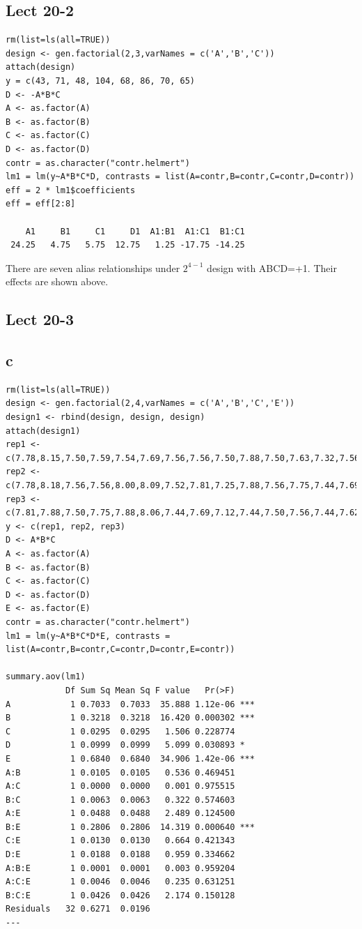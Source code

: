 \documentclass[11pt,letterpaper]{article}
\begin{document}
\newpage
\subsection*{Lect 20-2}
\begin{verbatim}
rm(list=ls(all=TRUE))
design <- gen.factorial(2,3,varNames = c('A','B','C'))
attach(design)
y = c(43, 71, 48, 104, 68, 86, 70, 65)
D <- -A*B*C
A <- as.factor(A)
B <- as.factor(B)
C <- as.factor(C)
D <- as.factor(D)
contr = as.character("contr.helmert")
lm1 = lm(y~A*B*C*D, contrasts = list(A=contr,B=contr,C=contr,D=contr))
eff = 2 * lm1$coefficients
eff = eff[2:8]

    A1     B1     C1     D1  A1:B1  A1:C1  B1:C1 
 24.25   4.75   5.75  12.75   1.25 -17.75 -14.25 
\end{verbatim}

\noindent There are seven alias relationships under $2^{4-1}$ design with ABCD=+1. Their effects are shown above.

\subsection*{Lect 20-3}
\subsection*{c}
\begin{verbatim}
rm(list=ls(all=TRUE))
design <- gen.factorial(2,4,varNames = c('A','B','C','E'))
design1 <- rbind(design, design, design)
attach(design1)
rep1 <- c(7.78,8.15,7.50,7.59,7.54,7.69,7.56,7.56,7.50,7.88,7.50,7.63,7.32,7.56,7.18,7.81)
rep2 <- c(7.78,8.18,7.56,7.56,8.00,8.09,7.52,7.81,7.25,7.88,7.56,7.75,7.44,7.69,7.18,7.50)
rep3 <- c(7.81,7.88,7.50,7.75,7.88,8.06,7.44,7.69,7.12,7.44,7.50,7.56,7.44,7.62,7.25,7.59)
y <- c(rep1, rep2, rep3)
D <- A*B*C
A <- as.factor(A)
B <- as.factor(B)
C <- as.factor(C)
D <- as.factor(D)
E <- as.factor(E)
contr = as.character("contr.helmert")
lm1 = lm(y~A*B*C*D*E, contrasts = list(A=contr,B=contr,C=contr,D=contr,E=contr))

summary.aov(lm1)
            Df Sum Sq Mean Sq F value   Pr(>F)    
A            1 0.7033  0.7033  35.888 1.12e-06 ***
B            1 0.3218  0.3218  16.420 0.000302 ***
C            1 0.0295  0.0295   1.506 0.228774    
D            1 0.0999  0.0999   5.099 0.030893 *  
E            1 0.6840  0.6840  34.906 1.42e-06 ***
A:B          1 0.0105  0.0105   0.536 0.469451    
A:C          1 0.0000  0.0000   0.001 0.975515    
B:C          1 0.0063  0.0063   0.322 0.574603    
A:E          1 0.0488  0.0488   2.489 0.124500    
B:E          1 0.2806  0.2806  14.319 0.000640 ***
C:E          1 0.0130  0.0130   0.664 0.421343    
D:E          1 0.0188  0.0188   0.959 0.334662    
A:B:E        1 0.0001  0.0001   0.003 0.959204    
A:C:E        1 0.0046  0.0046   0.235 0.631251    
B:C:E        1 0.0426  0.0426   2.174 0.150128    
Residuals   32 0.6271  0.0196                     
---
\end{verbatim}
\end{document}
